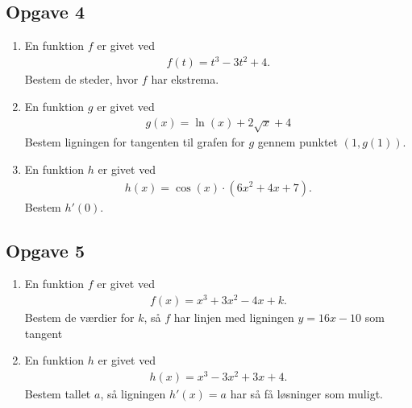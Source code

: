 \subsection*{Opgave 4}

\begin{enumerate}[label=\roman*)]
	\item En funktion $f$ er givet ved
	\begin{align*}
		f(t) = t^3 - 3t^2 + 4.
	\end{align*}
	Bestem de steder, hvor $f$ har ekstrema.
	\item En funktion $g$ er givet ved
	\begin{align*}
		g(x) = \ln(x)+2\sqrt{x}+4
	\end{align*}
	Bestem ligningen for tangenten til grafen for $g$ gennem punktet $(1,g(1))$. 
	\item En funktion $h$ er givet ved
	\begin{align*}
		h(x) = \cos(x)\cdot(6x^2+4x+7).
	\end{align*}
	Bestem $h'(0)$.

\end{enumerate}

\subsection*{Opgave 5}

\begin{enumerate}[label=\roman*)]
	\item En funktion $f$ er givet ved
	\begin{align*}
		f(x) = x^3 + 3x^2 - 4x + k.
	\end{align*}
	Bestem de værdier for $k$, så $f$ har linjen med ligningen $y = 16x-10$ som tangent
	\item En funktion $h$ er givet ved
	\begin{align*}
		h(x) = x^3-3x^2+3x+4.
	\end{align*}
	Bestem tallet $a$, så ligningen $h'(x) = a$ har så få løsninger som muligt.
\end{enumerate}

